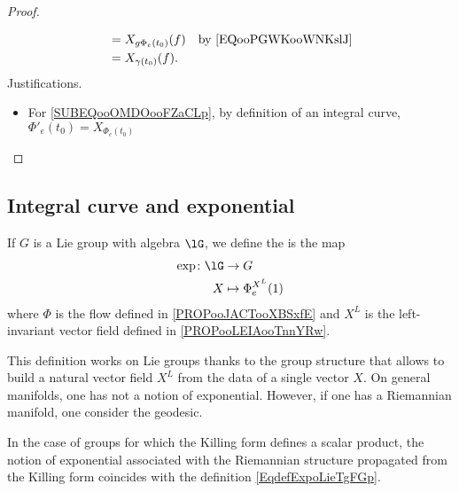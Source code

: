 \begin{proof}
\begin{subproof}
\begin{subequations}
\begin{align}
				            & =X_{g\Phi_e(t_0)}(f)                                                       & \text{by \eqref{EQooPGWKooWNKslJ}}          \\
				            & =X_{\gamma(t_0)}(f).
			\end{align}
		\end{subequations}
		Justifications.
		\begin{itemize}
			\item For \eqref{SUBEQooOMDOooFZaCLp}, by definition of an integral curve, \( \Phi'_e(t_0)=X_{\Phi_e(t_0)}\)
		\end{itemize}
	\end{subproof}
\end{proof}


\subsection{Integral curve and exponential}

\begin{definition}     \label{DEFooOLLZooMHRgsz}
	If \( G\) is a Lie group with algebra \( \lG\), we define the  is the map
	\begin{equation}\label{EqdefExpoLieTgFGp}
		\begin{aligned}
			\exp\colon \lG & \to G                   \\
			X              & \mapsto \Phi^{X^L}_e(1)
		\end{aligned}
	\end{equation}
	where \( \Phi\) is the flow defined in \ref{PROPooJACTooXBSxfE} and \( X^L\) is the left-invariant vector field defined in \ref{PROPooLEIAooTnnYRw}.
\end{definition}

\begin{normaltext}
	This definition works on Lie groups thanks to the group structure that allows to build a natural vector field \( X^L\) from the data of a single vector \( X\). On general manifolds, one has not a notion of exponential. However, if one has a Riemannian manifold, one consider the geodesic.

	In the case of groups for which the Killing form defines a scalar product, the notion of exponential associated with the Riemannian structure propagated from the Killing form coincides with the definition \eqref{EqdefExpoLieTgFGp}.
\end{normaltext}


